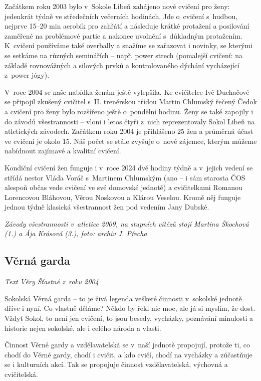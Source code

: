 \documentclass[a5paper, 12pt, twoside]{article}
\begin{document}
Začátkem roku 2003 bylo v~Sokole Libeň zahájeno nové cvičení pro ženy:
jedenkrát týdně ve středečních večerních hodinách. Jde o~cvičení
s~hudbou, nejprve 15--20 min aerobik pro zahřátí a následuje krátké
protažení a posilování zaměřené na problémové partie a nakonec uvolnění
s~důkladným protažením. K~cvičení používáme také overbally a snažíme se
zařazovat i novinky, se kterými se setkáme na různých seminářích --
např. power strech (pomalejší cvičení: na základě rovnovážných a
silových prvků a kontrolovaného dýchání vycházející z~power jógy).

V~roce 2004 se naše nabídka ženám ještě vylepšila. Ke cvičitelce Ivě
Duchačové se připojil zkušený cvičitel s~II. trenérskou třídou Martin
Chlumský řečený Čedok a cvičení pro ženy bylo rozšířeno ještě o~pondělní
hodinu. Ženy se také zapojily i do závodů všestrannosti -- vloni i letos
čtyři z~nich reprezentovaly Sokol Libeň na atletických závodech.
Začátkem roku 2004 je přihlášeno 25 žen a průměrná účast ve cvičení je
okolo 15. Náš počet se stále zvyšuje o~nové zájemce, kterým můžeme
nabídnout zajímavé a kvalitní cvičení.

Kondiční cvičení žen funguje i v~roce 2024 dvě hodiny týdně a v~jejich
vedení se střídá nestor Vláďa Voráč s~Martinem Chlumským (ano -- i sám
starosta ČOS alespoň občas vede cvičení ve své domovské jednotě) a
cvičitelkami Romanou Lorencovou Bláhovou, Věrou Noskovou a Klárou
Veselou. Kromě něj funguje jednou týdně klasická všestrannost žen pod
vedením Jany Dubské.


\textit{Závody všestrannosti v~atletice 2009, na stupních vítězů stojí
Martina Škochová (1.) a Ája Krásová (3.), foto: archiv J. Přecha}

\subsection{Věrná garda}

\textit{Text Věry Šťastné z~roku 2004}

Sokolská Věrná garda -- to je živá legenda veškeré činnosti v~sokolské
jednotě dříve i nyní. Co vlastně děláme? Někdo by řekl nic moc, ale já
si myslím, že dost. Vždyť Sokol, to není jen cvičení, to jsou besedy,
vycházky, poznávání minulosti a historie nejen sokolské, ale i celého
národa a vlasti.

Činnost Věrné gardy a vzdělavatelská se v~naší jednotě propojují,
protože ti, co chodí do Věrné gardy, chodí i cvičit, a kdo cvičí, chodí
na vycházky a zúčastňuje se i kulturních akcí. Tak se propojuje činnost
vzdělavatelská, výchovná a cvičitelská.
\end{document}
